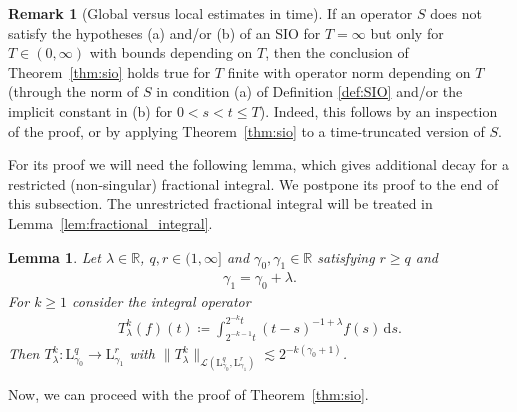 \documentclass[11pt, leqno]{amsart}
\newtheorem{lemma}[theorem]{Lemma}
\theoremstyle{definition}
\newtheorem{remark}[theorem]{Remark}
\newcommand{\R}{\mathbb{R}}
\renewcommand{\L}{\mathrm{L}}
\newcommand{\cL}{\mathcal{L}}
\renewcommand{\d}{\,\mathrm{d}}
\begin{document}
	\begin{remark}[Global versus local estimates in time]
		\label{rem:SIO_global_estimate}
		If an operator $S$ does not satisfy the hypotheses (a) and/or (b) of an SIO for $T = \infty$ but only for $T \in (0,\infty)$ with bounds depending on $T$, then the conclusion of Theorem~\ref{thm:sio} holds true for $T$ finite with operator norm depending on $T$ (through the norm of $S$ in condition (a) of Definition \ref{def:SIO} and/or the implicit constant in (b) for $0 < s < t \leq T$). Indeed, this follows by an inspection of the proof, or by applying Theorem~\ref{thm:sio} to a time-truncated version of $S$.
	\end{remark}

	For its proof we will need the following lemma, which gives additional decay for a restricted (non-singular) fractional integral. We postpone its proof to the end of this subsection. The unrestricted fractional integral will be treated in Lemma~\ref{lem:fractional_integral}.


	\begin{lemma}
		\label{lem:fractional_integral_decay}
		Let $\lambda \in \R$, $q,r \in (1,\infty]$ and $\gamma_0, \gamma_1 \in \R$ satisfying $r \geq q$ and
		\begin{align}
			\label{eq:fractional_integral_relation}
			\gamma_1 = \gamma_0 + \lambda.
		\end{align}
		For $k\geq 1$ consider the integral operator
		\begin{align}
			T_\lambda^k(f)(t) \coloneqq \int_{2^{-k-1} t}^{2^{-k} t} (t-s)^{-1+\lambda} f(s) \d s.
		\end{align}
		Then $T_\lambda^k \colon \L^q_{\gamma_0} \to \L^r_{\gamma_1}$ with $\| T_\lambda^k \|_{\cL(\L^q_{\gamma_0}, \L^r_{\gamma_1})} \lesssim 2^{-k(\gamma_0 + 1)}$.
	\end{lemma}

	Now, we can proceed with the proof of Theorem~\ref{thm:sio}.
\end{document}
